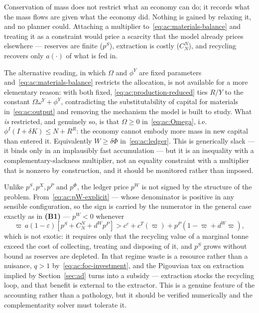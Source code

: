 \begin{remark}\label{rem:ac:ledger}
Conservation of mass does not restrict what an economy can do; it records what the mass flows are given what the economy did. Nothing is gained by relaxing it, and no planner could. Attaching a multiplier to~\eqref{eq:ac:materials-balance} and treating it as a constraint would price a scarcity that the model already prices elsewhere --- reserves are finite ($p^S$), extraction is costly ($C^N_N$), and recycling recovers only $a(\cdot)$ of what is fed in.

The alternative reading, in which $\Omega$ and $\phi^Y$ are fixed parameters and~\eqref{eq:ac:materials-balance} restricts the allocation, is not available for a more elementary reason: with both fixed, \eqref{eq:ac:production-reduced} ties $R/Y$ to the constant $\Omega\omega^Y+\phi^Y$, contradicting the substitutability of capital for materials in~\eqref{eq:ac:output} and removing the mechanism the model is built to study. What \emph{is} restricted, and genuinely so, is that $\Omega\ge0$ in~\eqref{eq:ac:Omega}, i.e.\ $\phi^I(I+\delta K)\le N+R^R$: the economy cannot embody more mass in new capital than entered it. Equivalently $W\ge\delta\Phi$ in~\eqref{eq:ac:ledger}. This is generically slack --- it binds only in an implausibly fast accumulation --- but it is an inequality with a complementary-slackness multiplier, not an equality constraint with a multiplier that is nonzero by construction, and it should be monitored rather than imposed.
\end{remark}

\begin{remark}\label{rem:ac:pW-sign}
Unlike $p^S,p^X,p^P$ and $p^\Phi$, the ledger price $p^W$ is not signed by the structure of the problem. From~\eqref{eq:ac:pW-explicit} --- whose denominator is positive in any sensible configuration, so the sign is carried by the numerator in the general case exactly as in \textbf{(B1)} --- $p^W<0$ whenever
\[
\varpi\,a(1-\varepsilon)\left[p^S+C^N_N+d^Wp^P\right]>c^c+c^T(\varpi)+p^P\left(1-\varpi+d^W\varpi\right),
\]
which is not exotic: it requires only that the recycling value of a marginal tonne exceed the cost of collecting, treating and disposing of it, and $p^S$ grows without bound as reserves are depleted. In that regime waste is a resource rather than a nuisance, $q>1$ by~\eqref{eq:ac:foc-investment}, and the Pigouvian tax on extraction implied by Section~\ref{sec:ad} turns into a subsidy --- extraction stocks the recycling loop, and that benefit is external to the extractor. This is a genuine feature of the accounting rather than a pathology, but it should be verified numerically and the complementarity solver must tolerate it.
\end{remark}

